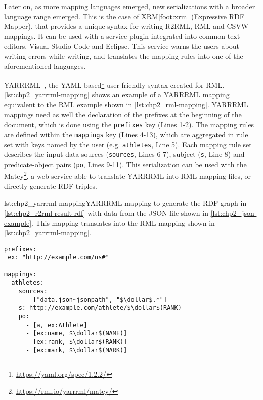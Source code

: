 Later on, as more mapping languages emerged, new serializations with a broader language range emerged. This is the case of XRM\cref{foot:xrm} (Expressive RDF Mapper), that provides a unique syntax for writing R2RML, RML and CSVW mappings. It can be used with a service plugin integrated into common text editors, Visual Studio Code and Eclipse. This service warns the users about writing errors while writing, and translates the mapping rules into one of the aforementioned languages. 

YARRRML~\parencite{Heyvaert2018yarrrml}, the YAML-based\footnote{\url{https://yaml.org/spec/1.2.2/}} user-friendly syntax created for RML. 
\cref{lst:chp2_yarrrml-mapping} shows an example of a YARRRML mapping equivalent to the RML example shown in \cref{lst:chp2_rml-mapping}. 
YARRRML mappings need as well the declaration of the prefixes at the beginning of the document, which is done using the \texttt{prefixes} key (Lines 1-2). The mapping rules are defined within the \texttt{mappings} key (Lines 4-13), which are aggregated in rule set with keys named by the user (e.g. \texttt{athletes}, Line 5). Each mapping rule set describes the input data sources (\texttt{sources}, Lines 6-7), subject (\texttt{s}, Line 8) and predicate-object pairs (\texttt{po}, Lines 9-11).
This serialization can be used with the Matey\footnote{\url{https://rml.io/yarrrml/matey/}}, a web service able to translate YARRRML into RML mapping files, or directly generate RDF triples. 

\begin{captionedlisting}{lst:chp2_yarrrml-mapping}{YARRRML mapping to generate the RDF graph in \cref{lst:chp2_r2rml-result-rdf} with data from the JSON file shown in \cref{lst:chp2_json-example}. This mapping translates into the RML mapping shown in \cref{lst:chp2_yarrrml-mapping}.}
\centering
{\begin{lstlisting}[language=yarrrml]
prefixes:
 ex: "http://example.com/ns#"

mappings:
  athletes:
    sources:
      - ["data.json~jsonpath", "$\dollar$.*"]
    s: http://example.com/athlete/$\dollar$(RANK)
    po:
      - [a, ex:Athlete]
      - [ex:name, $\dollar$(NAME)]
      - [ex:rank, $\dollar$(RANK)]
      - [ex:mark, $\dollar$(MARK)]
\end{lstlisting}}
\end{captionedlisting}
